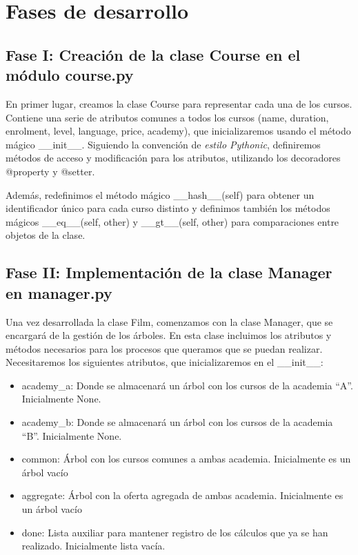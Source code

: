 \documentclass[a4paper]{article}
\begin{document}
\section{Fases de desarrollo}

\subsection{Fase I: Creación de la clase Course en el módulo course.py}

En primer lugar, creamos la clase Course para representar cada una de los cursos. Contiene una serie de atributos comunes a todos los cursos (name, duration, enrolment, level, language, price, academy), que inicializaremos usando el método mágico \_\_init\_\_. Siguiendo la convención de  \textit{estilo Pythonic}, definiremos métodos de acceso y modificación para los atributos, utilizando los decoradores @property y @setter.

Además, redefinimos el método mágico \_\_hash\_\_(self) para obtener un identificador único para cada curso distinto y definimos también los métodos mágicos \_\_eq\_\_(self, other) y \_\_gt\_\_(self, other) para comparaciones entre objetos de la clase. 

\subsection{Fase II: Implementación de la clase Manager en manager.py}

Una vez desarrollada la clase Film, comenzamos con la clase Manager, que se encargará de la gestión de los árboles. En esta clase incluimos los atributos y métodos necesarios para los procesos que queramos que se puedan realizar. Necesitaremos los siguientes atributos, que inicializaremos en el \_\_init\_\_:

\begin{itemize}

\item{academy\_a: Donde se almacenará un árbol con los cursos de la academia ``A''. Inicialmente None.}
\item{academy\_b: Donde se almacenará un árbol con los cursos de la academia ``B''. Inicialmente None.}
\item{common: Árbol con los cursos comunes a ambas academia. Inicialmente es un árbol vacío}
\item{aggregate: Árbol con la oferta agregada de ambas academia. Inicialmente es un árbol vacío}
\item{done: Lista auxiliar para mantener registro de los cálculos que ya se han realizado. Inicialmente lista vacía.}

\end{itemize}
\end{document}
